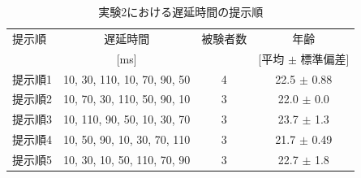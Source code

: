 \begin{table}[btp]
  \caption{実験2における遅延時間の提示順}
  \label{table:B_delay_time}
  \centering
  \begin{tabular}{lccc}
    \hline
    提示順 & 遅延時間 & 被験者数 & 年齢\\
    　& [ms] & & [平均 $\pm$ 標準偏差]\\
    \hline \hline
    提示順1  & 10, 30, 110, 10, 70, 90, 50  & 4 & 22.5 $\pm$ 0.88\\
    提示順2  & 10, 70, 30, 110, 50, 90, 10  & 3 & 22.0 $\pm$ 0.0\\
    提示順3  & 10, 110, 90, 50, 10, 30, 70  & 3 & 23.7 $\pm$ 1.3\\
    提示順4  & 10, 50, 90, 10, 30, 70, 110  & 3 & 21.7 $\pm$ 0.49\\
    提示順5  & 10, 30, 10, 50, 110, 70, 90  & 3 & 22.7 $\pm$ 1.8
\\
    \hline
  \end{tabular}
\end{table}
